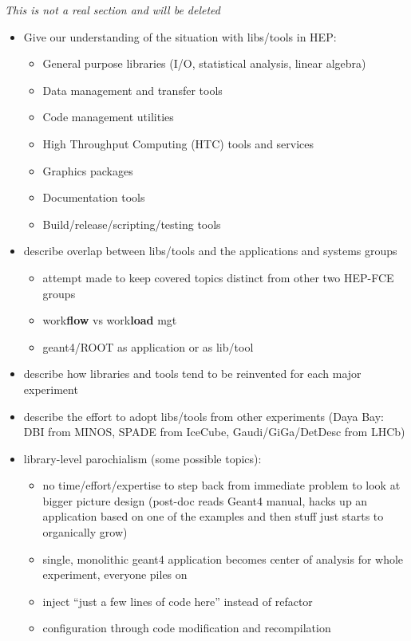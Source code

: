 \textit{This is not a real section and will be deleted}

\begin{itemize}
\item Give our understanding of the situation with libs/tools in HEP:
  \begin{itemize}
  \item General purpose libraries (I/O, statistical analysis, linear algebra)
  \item Data management and transfer tools
  \item Code management utilities
  \item High Throughput Computing (HTC) tools and services
  \item Graphics packages
  \item Documentation tools
  \item Build/release/scripting/testing tools
  \end{itemize}
\item describe overlap between libs/tools and the applications and systems groups
  \begin{itemize}
  \item attempt made to keep covered topics distinct from other two HEP-FCE groups
  \item work\textbf{flow} vs work\textbf{load} mgt
  \item geant4/ROOT as application or as lib/tool
  \end{itemize}
\item describe how libraries and tools tend to be reinvented for each major experiment 
\item describe the effort to adopt libs/tools from other experiments (Daya Bay: DBI from MINOS, SPADE from IceCube, Gaudi/GiGa/DetDesc from LHCb)
\item library-level parochialism (some possible topics):
  \begin{itemize}
  \item no time/effort/expertise to step back from immediate problem to look at bigger picture design (post-doc reads Geant4 manual, hacks up an application based on one of the examples and then stuff just starts to organically grow)
  \item single, monolithic geant4 application becomes center of analysis for whole experiment, everyone piles on
  \item inject ``just a few lines of code here'' instead of refactor
  \item configuration through code modification and recompilation

\end{itemize}
\end{itemize}
